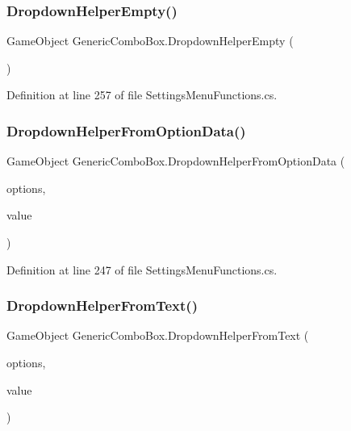\subsubsection{\texorpdfstring{Dropdown\+Helper\+Empty()}{DropdownHelperEmpty()}}
{\footnotesize\ttfamily Game\+Object Generic\+Combo\+Box.\+Dropdown\+Helper\+Empty (\begin{DoxyParamCaption}{ }\end{DoxyParamCaption})}



Definition at line 257 of file Settings\+Menu\+Functions.\+cs.

\mbox{\label{class_generic_combo_box_a2cc0272b4b15b0616938572ce370d741}} 
\subsubsection{\texorpdfstring{Dropdown\+Helper\+From\+Option\+Data()}{DropdownHelperFromOptionData()}}
{\footnotesize\ttfamily Game\+Object Generic\+Combo\+Box.\+Dropdown\+Helper\+From\+Option\+Data (\begin{DoxyParamCaption}\item[{Dropdown.\+Option\+Data \mbox{[}$\,$\mbox{]}}]{options,  }\item[{int}]{value }\end{DoxyParamCaption})}



Definition at line 247 of file Settings\+Menu\+Functions.\+cs.

\mbox{\label{class_generic_combo_box_a00685a1aa5fb9d5a76864652d80ec557}} 
\subsubsection{\texorpdfstring{Dropdown\+Helper\+From\+Text()}{DropdownHelperFromText()}}
{\footnotesize\ttfamily Game\+Object Generic\+Combo\+Box.\+Dropdown\+Helper\+From\+Text (\begin{DoxyParamCaption}\item[{string \mbox{[}$\,$\mbox{]}}]{options,  }\item[{int}]{value }\end{DoxyParamCaption})}



